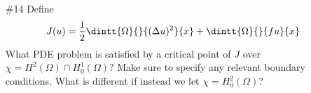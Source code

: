 \documentclass[11pt, oneside]{article}
\begin{document}
\begin{enumerate}
\begin{enumerate}
      \item[(b)]
        Show that the eigenvalues are positive.

        \begin{proof}
          
        \end{proof}

      \item[(c)]
        If $\rho(x) \ge 1$ in $\Omega$ and $\lambda_1$ denotes the smallest
        eigenvalue, show that $\lambda_1 < \lambda_1^*$ where $\lambda_1^*$ is
        the corresponding first eigenvalue of $-\Delta$ in $\Omega$.

    \end{enumerate}

  \item[\#14]
    Define
    \[
      J(u) = \frac{1}{2} \dintt{\Omega}{}{(\Delta u)^2}{x} + \dintt{\Omega}{}{fu}{x}
    \]
    What PDE problem is satisfied by a critical point of $J$ over
    $\chi = H^2(\Omega) \cap H_0^1(\Omega)$?
    Make sure to specify any relevant boundary conditions.
    What is different if instead we let $\chi = H^2_0(\Omega)$?
\end{enumerate}
\end{document}
